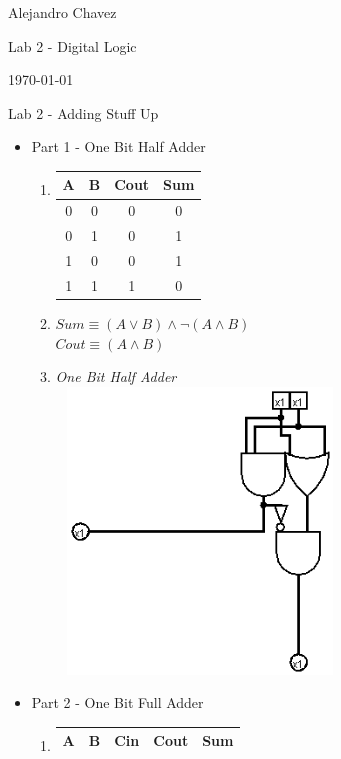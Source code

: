 \documentclass{article}
\begin{document}
\hfill Alejandro Chavez

\hfill Lab 2 - Digital Logic

\hfill \today \\
\begin{center}
\begin{large}
Lab 2 - Adding Stuff Up
\end{large}
\end{center}
\begin{itemize}
  \item Part 1 - One Bit Half Adder
  \begin{enumerate}
    \item
      \begin{tabular}{|c|c||c|c|}
        \hline
        A & B & Cout & Sum \\ \hline
        0 & 0 & 0 & 0\\
        0 & 1 & 0 & 1\\
        1 & 0 & 0 & 1\\
        1 & 1 & 1 & 0\\ \hline
      \end{tabular}
    \item
      $Sum\equiv (A\lor B)\land \lnot(A\land B)$\\
      $Cout\equiv (A\land B) $
    \item \textit{One Bit Half Adder}\\ 
      \includegraphics[height=3in,width=3in]{onebithalfadder.png} 
  \end{enumerate}
  \item Part 2 - One Bit Full Adder
  \begin{enumerate}
    \item 
      \begin{tabular}{|c|c|c||c|c|}
        \hline
        A & B & Cin & Cout & Sum \\ \hline

\end{tabular}
\end{enumerate}
\end{itemize}
\end{document}
